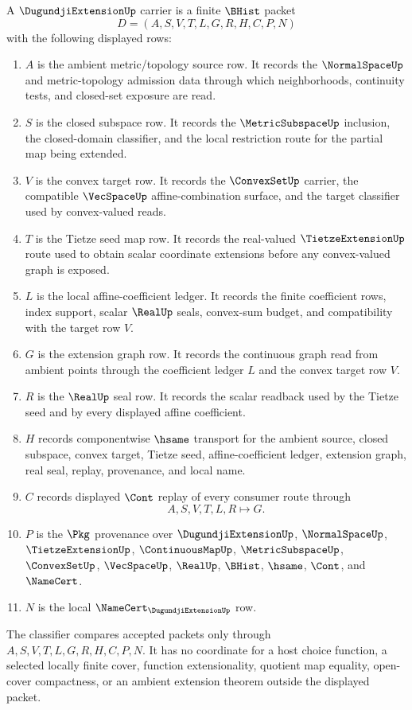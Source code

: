 \begin{definition}
\label{def:dugundji-extension-carrier}
A $\DugundjiExtensionUp$ carrier is a finite $\BHist$ packet
$$
D=(A,S,V,T,L,G,R,H,C,P,N)
$$
with the following displayed rows:
\begin{enumerate}
\item $A$ is the ambient metric/topology source row. It records the $\NormalSpaceUp$ and metric-topology admission data through which neighborhoods, continuity tests, and closed-set exposure are read.
\item $S$ is the closed subspace row. It records the $\MetricSubspaceUp$ inclusion, the closed-domain classifier, and the local restriction route for the partial map being extended.
\item $V$ is the convex target row. It records the $\ConvexSetUp$ carrier, the compatible $\VecSpaceUp$ affine-combination surface, and the target classifier used by convex-valued reads.
\item $T$ is the Tietze seed map row. It records the real-valued $\TietzeExtensionUp$ route used to obtain scalar coordinate extensions before any convex-valued graph is exposed.
\item $L$ is the local affine-coefficient ledger. It records the finite coefficient rows, index support, scalar $\RealUp$ seals, convex-sum budget, and compatibility with the target row $V$.
\item $G$ is the extension graph row. It records the continuous graph read from ambient points through the coefficient ledger $L$ and the convex target row $V$.
\item $R$ is the $\RealUp$ seal row. It records the scalar readback used by the Tietze seed and by every displayed affine coefficient.
\item $H$ records componentwise $\hsame$ transport for the ambient source, closed subspace, convex target, Tietze seed, affine-coefficient ledger, extension graph, real seal, replay, provenance, and local name.
\item $C$ records displayed $\Cont$ replay of every consumer route through
$$
A,S,V,T,L,R \longmapsto G .
$$
\item $P$ is the $\Pkg$ provenance over $\DugundjiExtensionUp$, $\NormalSpaceUp$, $\TietzeExtensionUp$, $\ContinuousMapUp$, $\MetricSubspaceUp$, $\ConvexSetUp$, $\VecSpaceUp$, $\RealUp$, $\BHist$, $\hsame$, $\Cont$, and $\NameCert$.
\item $N$ is the local $\NameCert_{\DugundjiExtensionUp}$ row.
\end{enumerate}
The classifier compares accepted packets only through $A,S,V,T,L,G,R,H,C,P,N$. It has no coordinate for a host choice function, a selected locally finite cover, function extensionality, quotient map equality, open-cover compactness, or an ambient extension theorem outside the displayed packet.
\end{definition}


